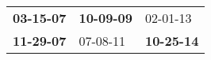 \begin{supertabular}{p{0.33\columnwidth}p{0.33\columnwidth}p{0.33\columnwidth}}
 \textbf{03-15-07\textsuperscript{}} &  \textbf{10-09-09\textsuperscript{}} &           02-01-13\textsuperscript{} \\
 \textbf{11-29-07\textsuperscript{}} &           07-08-11\textsuperscript{} &  \textbf{10-25-14\textsuperscript{}} \\
\end{supertabular}
